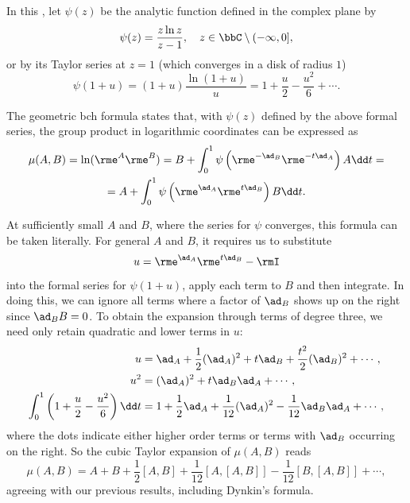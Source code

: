 In this \sect, let $\psi(z)$ be the analytic function defined in the complex plane by
\[\psi(z)=\frac{z\ln z}{z-1},\quad z\in\bbC\setminus(-\infty,0],\]
or by its Taylor series at $z=1$ (which converges in a disk of radius $1$)
\[\psi(1+u)=(1+u)\frac{\ln (1+u)}{u}=1+\frac{u}{2}-\frac{u^2}{6}+\cdots .\]

\begin{thm}
The geometric \gls{bch} formula states that, with $\psi(z)$ defined by the above formal series, the group product in logarithmic coordinates can be expressed as
\begin{multline}
    \mu(A,B) =\ln(\rme^A\rme^B)=
    B+\int_0^1\psi\left(\rme^{-\ad_B}\rme^{-t\ad_A}\right)A\dd t=\\
    =A+\int_0^1\psi\left(\rme^{\ad_A}\rme^{t\ad_B}\right)B\dd t.\label{eq geom BCH}
\end{multline}
\end{thm}
At sufficiently small $A$ and $B$, where the series for $\psi$ converges, this formula can be taken literally. For general $A$ and $B$, it requires us to substitute 
\[u=\rme^{\ad_A}\rme^{t\ad_B}-\rmI\]
into the formal series for $\psi(1+u)$, apply each term to $B$ and then integrate. In doing this, we can ignore all terms where a factor of $\ad_B$ shows up on the right since $\ad_B B=0$. To obtain the expansion through terms of degree three, we need only retain quadratic and lower terms in $u$:
\begin{align}
    u  &=\ad_A+\frac12(\ad_A)^2+t\ad_B+\frac{t^2}{2}(\ad_B)^2+\cdots,\\
    u^2&=(\ad_A)^2+t\ad_B\ad_A+\cdots,\\
    \int_0^1\left(1+\frac u2-\frac{u^2}{6}\right)\dd t&= 1+\frac 12\ad_A+\frac{1}{12}(\ad_A)^2-\frac{1}{12}\ad_B \ad_A+\cdots,
\end{align}
where the dots indicate either higher order terms or terms with $\ad_B$ occurring on the right. So the cubic Taylor expansion of $\mu(A,B)$ reads
\[\mu(A,B)=A+B+\frac12[A,B]+\frac{1}{12}[A,[A,B]]-\frac{1}{12}[B,[A,B]]+\cdots,\]
agreeing with our previous results, including Dynkin's formula.

